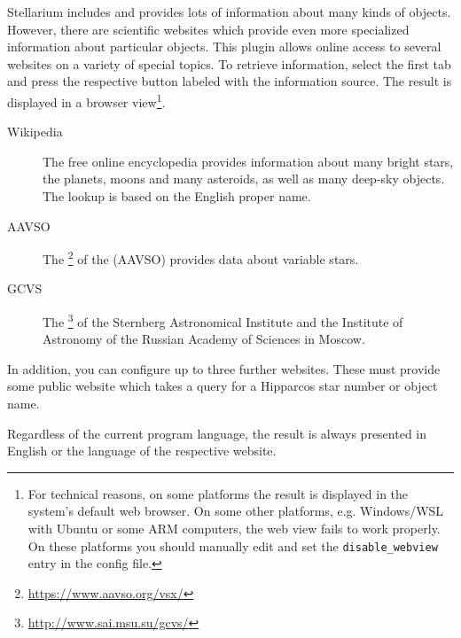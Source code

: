 Stellarium includes and provides lots of information about many kinds
of objects. However, there are scientific websites which provide even
more specialized information about particular objects. This plugin 
\citep{Zotti-etal:SEAC2021} allows online access to several websites on a
variety of special topics. To retrieve information, select the
first tab and press the respective button labeled with the information source. 
The result is displayed in a browser view\footnote{%
  For technical reasons, on some platforms the
  result is displayed in the system's default web browser.  On some
  other platforms, e.g. Windows/WSL with Ubuntu or some ARM computers, the
  web view fails to work properly.  On these platforms you should
  manually edit  and set the
  \texttt{disable\_webview} entry in the config file.}.

\begin{description}
\item[Wikipedia] The free online encyclopedia provides information
  about many bright stars, the planets, moons and many asteroids, as
  well as many deep-sky objects. The lookup is based on the English
  proper name.
\item[AAVSO] The \footnote{\url{https://www.aavso.org/vsx/}} of the
   (AAVSO)
  provides data about variable stars.
\item[GCVS] The \footnote{\url{http://www.sai.msu.su/gcvs/}} of the Sternberg
  Astronomical Institute and the Institute of Astronomy of the Russian
  Academy of Sciences in Moscow.
\end{description}

In addition, you can configure up to three further websites. These
must provide some public website which takes a query for a Hipparcos
star number or object name.  

Regardless of the current program language, the result is always
presented in English or the language of the respective website.


